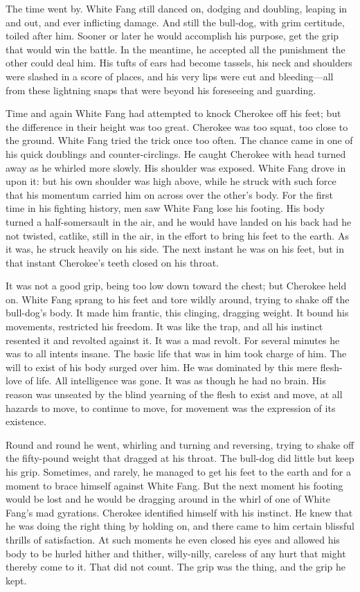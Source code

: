 \documentclass[10pt]{book}
\begin{document}
The time went by. White Fang still danced on, dodging and doubling,
leaping in and out, and ever inflicting damage. And still the bull-dog,
with grim certitude, toiled after him. Sooner or later he would
accomplish his purpose, get the grip that would win the battle. In the
meantime, he accepted all the punishment the other could deal him. His
tufts of ears had become tassels, his neck and shoulders were slashed
in a score of places, and his very lips were cut and bleeding—all from
these lightning snaps that were beyond his foreseeing and guarding.

Time and again White Fang had attempted to knock Cherokee off his feet;
but the difference in their height was too great. Cherokee was too
squat, too close to the ground. White Fang tried the trick once too
often. The chance came in one of his quick doublings and
counter-circlings. He caught Cherokee with head turned away as he
whirled more slowly. His shoulder was exposed. White Fang drove in upon
it: but his own shoulder was high above, while he struck with such
force that his momentum carried him on across over the other’s body.
For the first time in his fighting history, men saw White Fang lose his
footing. His body turned a half-somersault in the air, and he would
have landed on his back had he not twisted, catlike, still in the air,
in the effort to bring his feet to the earth. As it was, he struck
heavily on his side. The next instant he was on his feet, but in that
instant Cherokee’s teeth closed on his throat.

It was not a good grip, being too low down toward the chest; but
Cherokee held on. White Fang sprang to his feet and tore wildly around,
trying to shake off the bull-dog’s body. It made him frantic, this
clinging, dragging weight. It bound his movements, restricted his
freedom. It was like the trap, and all his instinct resented it and
revolted against it. It was a mad revolt. For several minutes he was to
all intents insane. The basic life that was in him took charge of him.
The will to exist of his body surged over him. He was dominated by this
mere flesh-love of life. All intelligence was gone. It was as though he
had no brain. His reason was unseated by the blind yearning of the
flesh to exist and move, at all hazards to move, to continue to move,
for movement was the expression of its existence.

Round and round he went, whirling and turning and reversing, trying to
shake off the fifty-pound weight that dragged at his throat. The
bull-dog did little but keep his grip. Sometimes, and rarely, he
managed to get his feet to the earth and for a moment to brace himself
against White Fang. But the next moment his footing would be lost and
he would be dragging around in the whirl of one of White Fang’s mad
gyrations. Cherokee identified himself with his instinct. He knew that
he was doing the right thing by holding on, and there came to him
certain blissful thrills of satisfaction. At such moments he even
closed his eyes and allowed his body to be hurled hither and thither,
willy-nilly, careless of any hurt that might thereby come to it. That
did not count. The grip was the thing, and the grip he kept.
\end{document}
